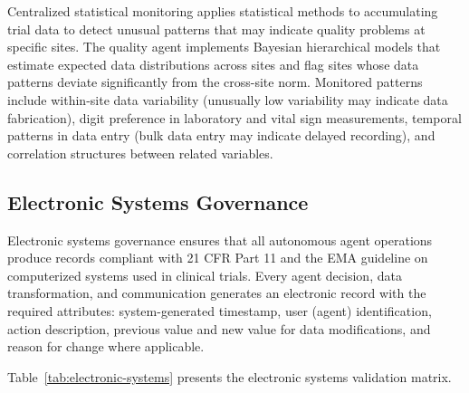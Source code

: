 Centralized statistical monitoring applies statistical methods to accumulating trial data
to detect unusual patterns that may indicate quality problems at specific sites. The quality
agent implements Bayesian hierarchical models that estimate expected data distributions
across sites and flag sites whose data patterns deviate significantly from the cross-site
norm. Monitored patterns include within-site data variability (unusually low variability
may indicate data fabrication), digit preference in laboratory and vital sign measurements,
temporal patterns in data entry (bulk data entry may indicate delayed recording), and
correlation structures between related variables.

\subsection{Electronic Systems Governance}

Electronic systems governance ensures that all autonomous agent operations produce records
compliant with 21 CFR Part 11 \cite{cfr-part-11} and the EMA guideline on computerized
systems used in clinical trials. Every agent decision, data transformation, and communication
generates an electronic record with the required attributes: system-generated timestamp, user
(agent) identification, action description, previous value and new value for data
modifications, and reason for change where applicable.

Table~\ref{tab:electronic-systems} presents the electronic systems validation matrix.


